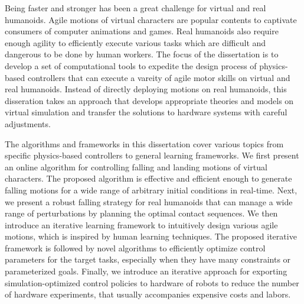 
Being faster and stronger has been a great challenge for virtual and real
humanoids.
Agile motions of virtual characters are popular contents to captivate consumers
of computer animations and games.
Real humanoids also require enough agility to efficiently execute various
tasks which are difficult and dangerous to be done by human workers.
The focus of the dissertation is to develop a set of computational tools to
expedite the design process of physics-based controllers that can execute a
vareity of agile motor skills on virtual and real humanoids.
Instead of directly deploying motions on real humanoids, this disseration takes
an approach that develops appropriate theories and models on virtual simulation
and transfer the solutions to hardware systems with careful adjustments.

The algorithms and frameworks in this dissertation cover various topics from
specific physics-based controllers to general learning frameworks.
We first present an online algorithm for controlling falling and landing
motions of virtual characters.
The proposed algorithm is effective and efficient enough to generate falling
motions for a wide range of arbitrary initial conditions in real-time.
Next, we present a robust falling strategy for real humanoids that can manage
a wide range of perturbations by planning the optimal contact sequences.
We then introduce an iterative learning framework to intuitively design various
agile motions, which is inspired by human learning techniques.
The proposed iterative framework is followed by novel algorithms to
efficiently optimize control parameters for the target tasks, especially when
they have many constraints or parameterized goals.
Finally, we introduce an iterative approach for exporting simulation-optimized
control policies to hardware of robots to reduce the number of hardware
experiments, that usually accompanies expensive costs and labors.





